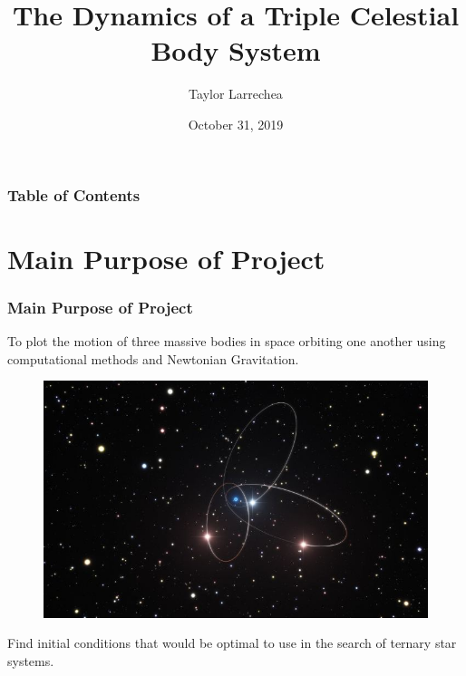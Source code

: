 \documentclass{beamer}
\title[Motion of Three Bodies in Space]{The Dynamics of a Triple Celestial Body System} %
\author{Taylor Larrechea} %
\institute[CMU] %
{
Colorado Mesa University \\ %
\medskip
}
\date{October 31, 2019} %
\begin{document}
\begin{frame}
\titlepage %
\end{frame}
\begin{frame}
\frametitle{Table of Contents} %
\tableofcontents %
\end{frame}
\section{Main Purpose of Project}
\begin{frame}
\frametitle{Main Purpose of Project}
To plot the motion of three massive bodies in space orbiting one another using computational methods and Newtonian Gravitation.
\begin{figure}[htpb]
\begin{center}
\includegraphics[width=0.85\linewidth]{Stars.jpg} 
\end{center}
\end{figure}
Find initial conditions that would be optimal to use in the search of ternary star systems.
\end{frame}
\end{document}
